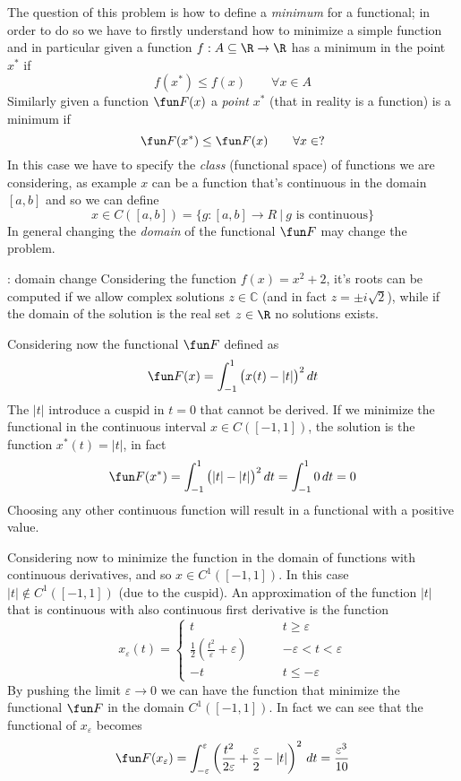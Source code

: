 The question of this problem is how to define a \textit{minimum} for a functional; in order to do so we have to firstly understand how to minimize a simple function and in particular given a function $f: A\subseteq \R \rightarrow \R$ has a minimum in the point $x^*$ if
\[  f(x^*) \leq f(x) \qquad \forall x \in A \]
Similarly given a function $\fun F(x)$ a \textit{point} $x^*$ (that in reality is a function) is a minimum if 
\[ \fun F(x^*) \leq \fun F(x) \qquad \forall x \in ? \]
In this case we have to specify the \textit{class} (functional space) of functions we are considering, as example $x$ can be a function that's continuous in the domain $[a,b]$ and so we can define
\[ x\in C([a,b]) = \big\{ g:[a,b]\rightarrow R \ | \ g \textrm{ is continuous} \big\} \]
In general changing the \textit{domain} of the functional $\fun F$ may change the problem.
\begin{example}{: domain change}
	Considering the function $f(x) = x^2+2$, it's roots can be computed if we allow complex solutions $z\in \mathds C$ (and in fact $z = \pm i \sqrt 2$), while if the domain of the solution is the real set $z\in \R$ no solutions exists. \vspace{3mm}
	
	Considering now the functional $\fun F$ defined as
	\[ \fun F(x) = \int_{-1}^1 \big(x(t) - |t|\big)^2\, dt \]
	The $|t|$ introduce a cuspid in $t=0$ that cannot be derived. If we minimize the functional in the continuous interval $x\in C([-1,1])$, the solution is the function $x^*(t) = |t|$, in fact
	\[ \fun F(x^*) = \int_{-1}^1 \big(|t|-|t|\big)^2 \, dt = \int_{-1}^1 0\, dt = 0 \]
	Choosing any other continuous function will result in a functional with a positive value.
	
	Considering now to minimize the function in the domain of functions with continuous derivatives, and so $x\in C^1([-1,1])$. In this case $|t|\notin C^1([-1,1])$ (due to the cuspid). An approximation of the function $|t|$ that is continuous with also continuous first derivative is the function
	\[ x_\varepsilon(t) = \begin{cases}
		t \qquad & t \geq \varepsilon \\
		\frac 1 2 \left(\frac{t^2}\varepsilon + \varepsilon\right) \qquad & -\varepsilon < t< \varepsilon \\
		-t & t \leq- \varepsilon
	\end{cases} \]
	By pushing the limit $\varepsilon\rightarrow 0$ we can have the function that minimize the functional $\fun F$ in the domain $C^1([-1,1])$. In fact we can see that the functional of $x_\varepsilon$ becomes
	\[ \fun F(x_\varepsilon) = \int_{-\varepsilon}^\varepsilon \left( \frac{t^2}{2\varepsilon} + \frac \varepsilon 2 - |t| \right)^2\, dt = \frac{\varepsilon^3}{10} \]
	
\end{example}


